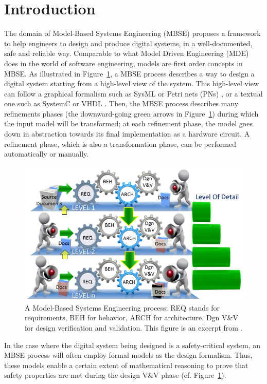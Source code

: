 \section{Introduction}
\label{sec:intro}

The domain of Model-Based Systems Engineering (MBSE) \cite{Long2011}
proposes a framework to help engineers to design and produce digital
systems, in a well-documented, safe and reliable way. Comparable to
what Model Driven Engineering (MDE) does in the world of software
engineering, models are first order concepts in MBSE.  As illustrated
in Figure~\ref{fig:MBSE-ps}, a MBSE process describes a way to design
a digital system starting from a high-level view of the system. This
high-level view can follow a graphical formalism such as SysML
\cite{Friedenthal2014} or Petri nets (PNs) \cite{Petri1962}, or a
textual one such as SystemC \cite{Black2009} or VHDL
\cite{Ashenden2010}. Then, the MBSE process describes many refinements
phases (the downward-going green arrows in Figure~\ref{fig:MBSE-ps})
during which the input model will be transformed; at each refinement
phase, the model goes down in abstraction towards its final
implementation as a hardware circuit. A refinement phase, which is
also a transformation phase, can be performed automatically or
manually.

\begin{figure}[H] \centering
\includegraphics[keepaspectratio,width=.7\textwidth]{MBSE-ps.png}
  \caption[A Model-Based Systems Engineering process.]{A Model-Based
Systems Engineering process; REQ stands for requirements, BEH for
behavior, ARCH for architecture, Dgn V\&V for design verification and
validation. This figure is an excerpt from \cite{Long2011}.}
  \label{fig:MBSE-ps}
\end{figure}

In the case where the digital system being designed is a
safety-critical system, an MBSE process will often employ formal
models as the design formalism. Thus, these models enable a certain
extent of mathematical reasoning to prove that safety properties are
met during the design V\&V phase (cf. Figure~\ref{fig:MBSE-ps}).


